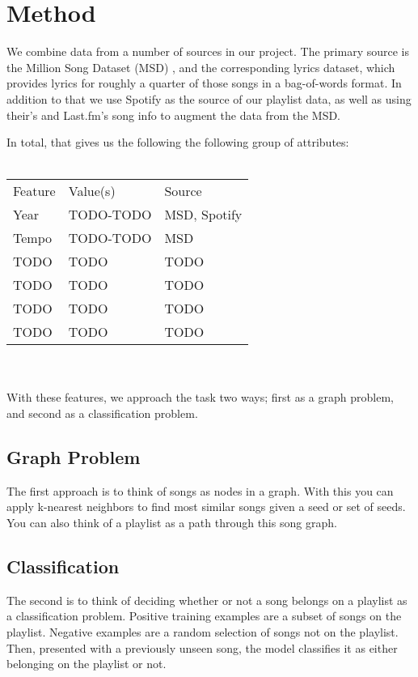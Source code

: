 \documentclass[10pt,journal,compsoc]{IEEEtran}
\begin{document}
\section{Method}
We combine data from a number of sources in our project. The primary source is the Million Song Dataset (MSD) \cite{msd}, and the corresponding lyrics dataset, which provides lyrics for roughly a quarter of those songs in a bag-of-words format. In addition to that we use Spotify \cite{spotify} as the source of our playlist data, as well as using their's and Last.fm's \cite{lastfm} song info to augment the data from the MSD.

In total, that gives us the following the following group of attributes:
\\\\
\begin{tabular}{lll}
Feature    & Value(s)       & Source          \\
Year       & TODO-TODO      & MSD, Spotify    \\
Tempo      & TODO-TODO      & MSD             \\
TODO       & TODO           & TODO            \\
TODO       & TODO           & TODO            \\
TODO       & TODO           & TODO            \\
TODO       & TODO           & TODO            \\
\end{tabular}
\\\\
With these features, we approach the task two ways; first as a graph problem, and second as a classification problem.

\subsection{Graph Problem}
The first approach is to think of songs as nodes in a graph. With this you can apply k-nearest neighbors to find most similar songs given a seed or set of seeds. You can also think of a playlist as a path through this song graph. \cite{Alghoniemy01anetwork}

\subsection{Classification}
The second is to think of deciding whether or not a song belongs on a playlist as a classification problem. Positive training examples are a subset of songs on the playlist. Negative examples are a random selection of songs not on the playlist. Then, presented with a previously unseen song, the model classifies it as either belonging on the playlist or not.
\end{document}
